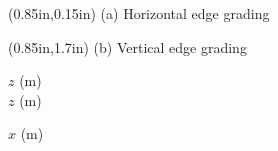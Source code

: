 \documentclass{article}
\begin{document}
\TPMargin{2pt}
\begin{textblock*}{13em}(0.85in,0.15in)
\normalsize
{}
(a) Horizontal edge grading
\end{textblock*}
\begin{textblock*}{11em}(0.85in,1.7in)
\normalsize
{}
(b) Vertical edge grading
\end{textblock*}

$z$ (\si{\meter}) 
\\
$z$ (\si{\meter}) 

\vspace{0.5em}
\hspace*{18em}$x$ (\si{\meter})
\end{document}
